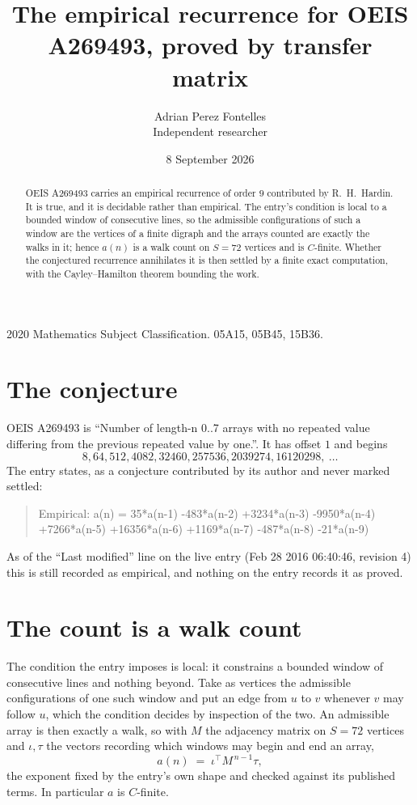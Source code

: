 \documentclass[11pt,a4paper]{article}
\title{The empirical recurrence for OEIS A269493, proved by transfer matrix}
\author{Adrian Perez Fontelles\\ \small Independent researcher}
\date{8 September 2026}
\theoremstyle{plain}
\theoremstyle{definition}
\begin{document}
\maketitle

\begin{abstract}
OEIS A269493 carries an empirical recurrence of order $9$ contributed by R.~H.~Hardin. It is
true, and it is decidable rather than empirical. The entry's condition is local to a bounded window of consecutive lines, so
the admissible configurations of such a window are the vertices of a finite digraph and the
arrays counted are exactly the walks in it; hence $a(n)$ is a walk count on $S=72$ vertices
and is $C$-finite. Whether the conjectured recurrence annihilates it is then settled by a
finite exact computation, with the Cayley--Hamilton theorem bounding the work.
\end{abstract}

\noindent\small 2020 Mathematics Subject Classification. 05A15, 05B45, 15B36.\normalsize

\section{The conjecture}

OEIS A269493 is ``Number of length-n 0..7 arrays with no repeated value differing from the previous repeated value by one.''. It has offset $1$ and begins
\[
8, 64, 512, 4082, 32460, 257536, 2039274, 16120298,\ \dots
\]
The entry states, as a conjecture contributed by its author and never marked settled:
\begin{quote}
Empirical: a(n) = 35*a(n-1) -483*a(n-2) +3234*a(n-3) -9950*a(n-4) +7266*a(n-5) +16356*a(n-6) +1169*a(n-7) -487*a(n-8) -21*a(n-9)
\end{quote}
As of the ``Last modified'' line on the live entry (Feb 28 2016 06:40:46, revision 4) this is still
recorded as empirical, and nothing on the entry records it as proved.

\section{The count is a walk count}

The condition the entry imposes is local: it constrains a bounded window of consecutive lines and nothing beyond. Take as
vertices the admissible configurations of one such window and put an edge from $u$ to $v$
whenever $v$ may follow $u$, which the condition decides by inspection of the two. An
admissible array is then exactly a walk, so with $M$ the adjacency matrix on $S=72$ vertices
and $\iota,\tau$ the vectors recording which windows may begin and end an array,
\[
a(n)\;=\;\iota^{\!\top}M^{\,n-1}\tau ,
\]
the exponent fixed by the entry's own shape and checked against its published terms. In
particular $a$ is $C$-finite.
\end{document}
